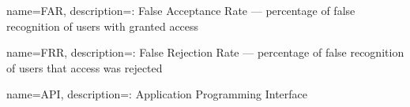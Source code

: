 \makeglossaries

{
name=FAR,
description={: False Acceptance Rate --- percentage of false recognition of users with granted access}
}

{
name=FRR,
description={: False Rejection Rate --- percentage of false recognition of users that access was rejected}
}

{
name=API,
description={: Application Programming Interface}
}


